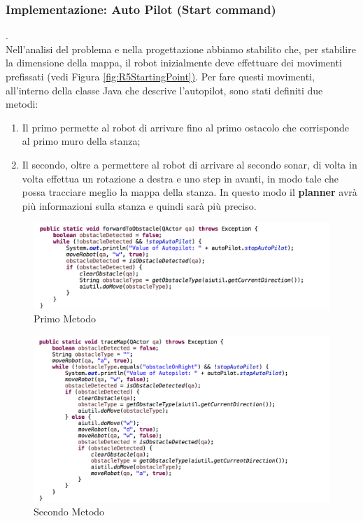 \documentclass{llncs}
\newcommand{\java}{\textsf{Java }}
\begin{document}
\subsubsection{Implementazione: Auto Pilot (Start command)}.
\label{ImplementazioneAutoPilotReq5}
\vspace*{1ex}
\\
Nell'analisi del problema e nella progettazione abbiamo stabilito che, per stabilire la dimensione della mappa, il robot inizialmente deve effettuare dei movimenti prefissati (vedi Figura \hyperref[fig:R5StartingPoint]{\ref{fig:R5StartingPoint})}. Per fare questi movimenti, all'interno della classe \java che descrive l'autopilot, sono stati definiti due metodi:
\begin{enumerate}
    \item Il primo permette al robot di arrivare fino al primo ostacolo che corrisponde al primo muro della stanza;
    \item Il secondo, oltre a permettere al robot di arrivare al secondo sonar, di volta in volta effettua un rotazione a destra e uno step in avanti, in modo tale che possa tracciare meglio la mappa della stanza. In questo modo il \textbf{planner} avr\`a pi\`u informazioni sulla stanza e quindi sar\`a pi\`u preciso.
\end{enumerate}
\begin{figure}
    \centering
    \includegraphics[width=1\textwidth]{Immagini/Requisito5/forwardToObstacle.png}
    \caption{Primo Metodo}
    \label{fig:forwardToObstacle}
\end{figure}
\begin{figure}
    \centering
    \includegraphics[width=1\textwidth]{Immagini/Requisito5/traceMap.png}
    \caption{Secondo Metodo}
    \label{fig:secondoMetodo}
\end{figure}
\end{document}
